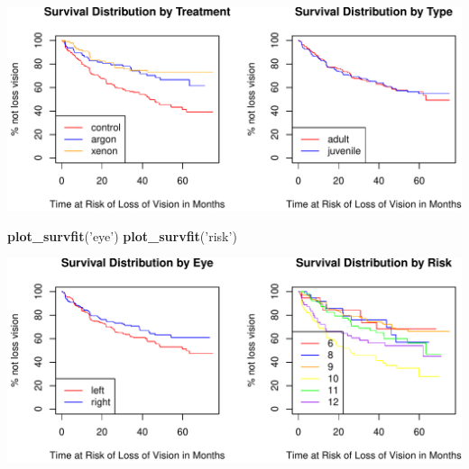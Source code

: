 \documentclass[
]{article}
\newenvironment{Shaded}{\begin{snugshade}}{\end{snugshade}}
\newcommand{\KeywordTok}[1]{\textcolor[rgb]{0.13,0.29,0.53}{\textbf{#1}}}
\newcommand{\NormalTok}[1]{#1}
\newcommand{\StringTok}[1]{\textcolor[rgb]{0.31,0.60,0.02}{#1}}
\begin{document}
\includegraphics{stats504_hw2_files/figure-latex/unnamed-chunk-6-1.pdf}

\begin{Shaded}
\begin{Highlighting}[]
\KeywordTok{plot_survfit}\NormalTok{(}\StringTok{'eye'}\NormalTok{)}
\KeywordTok{plot_survfit}\NormalTok{(}\StringTok{'risk'}\NormalTok{)}
\end{Highlighting}
\end{Shaded}

\includegraphics{stats504_hw2_files/figure-latex/unnamed-chunk-6-2.pdf}
\end{document}
